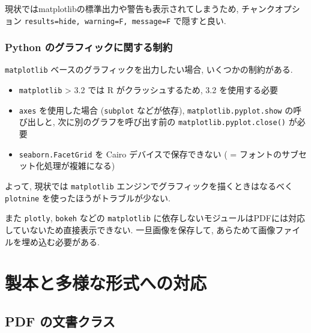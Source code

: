 \documentclass[
]{bxjsbook}
\providecommand{\tightlist}{%
  \setlength{\itemsep}{0pt}\setlength{\parskip}{0pt}}
\theoremstyle{definition}
\theoremstyle{definition}
\theoremstyle{definition}
\theoremstyle{remark}
\begin{document}
現状ではmatplotlibの標準出力や警告も表示されてしまうため,
チャンクオプション
\texttt{results=\textquotesingle{}hide\textquotesingle{},\ warning=F,\ message=F}
で隠すと良い.

\hypertarget{python-ux306eux30b0ux30e9ux30d5ux30a3ux30c3ux30afux306bux95a2ux3059ux308bux5236ux7d04}{%
\section{Python
のグラフィックに関する制約}\label{python-ux306eux30b0ux30e9ux30d5ux30a3ux30c3ux30afux306bux95a2ux3059ux308bux5236ux7d04}}

\texttt{matplotlib} ベースのグラフィックを出力したい場合,
いくつかの制約がある.

\begin{itemize}
\tightlist
\item
  \texttt{matplotlib} \textgreater{} 3.2 では R がクラッシュするため,
  3.2 を使用する必要
\item
  \texttt{axes} を使用した場合 (\texttt{subplot} などが依存),
  \texttt{matplotlib.pyplot.show} の呼び出しと,
  次に別のグラフを呼び出す前の \texttt{matplotlib.pyplot.close()} が必要
\item
  \texttt{seaborn.FacetGrid} を Cairo デバイスで保存できない ( =
  フォントのサブセット化処理が複雑になる)
\end{itemize}

よって, 現状では \texttt{matplotlib}
エンジンでグラフィックを描くときはなるべく \texttt{plotnine}
を使ったほうがトラブルが少ない.

また \texttt{plotly}, \texttt{bokeh} などの \texttt{matplotlib}
に依存しないモジュールはPDFには対応していないため直接表示できない.
一旦画像を保存して, あらためて画像ファイルを埋め込む必要がある.

\hypertarget{part-ux88fdux672cux3068ux591aux69d8ux306aux5f62ux5f0fux3078ux306eux5bfeux5fdc}{%
\part{
製本と多様な形式への対応}\label{part-ux88fdux672cux3068ux591aux69d8ux306aux5f62ux5f0fux3078ux306eux5bfeux5fdc}}

\hypertarget{pdf-ux306eux6587ux66f8ux30afux30e9ux30b9}{%
\chapter{PDF
の文書クラス}\label{pdf-ux306eux6587ux66f8ux30afux30e9ux30b9}}
\end{document}
